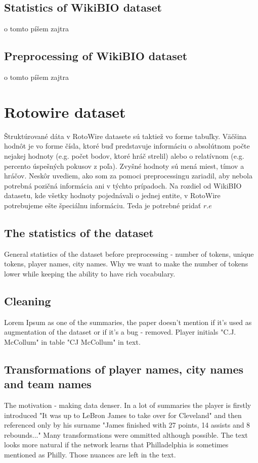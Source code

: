 \subsection{Statistics of WikiBIO dataset}
o tomto píšem zajtra

\subsection {Preprocessing of WikiBIO dataset}
o tomto píšem zajtra


\section{Rotowire dataset}

Štruktúrované dáta v RotoWire datasete sú taktiež vo forme tabuľky. Väčšina hodnôt je vo forme čísla, ktoré buď predstavuje informáciu o absolútnom počte nejakej hodnoty (e.g. počet bodov, ktoré hráč strelil) alebo o relatívnom (e.g. percento úspešných pokusov z poľa). Zvyšné hodnoty sú mená miest, tímov a hráčov. Neskôr uvediem, ako som za pomoci preprocessingu zariadil, aby nebola potrebná pozičná informácia ani v týchto prípadoch. Na rozdiel od WikiBIO datasetu, kde všetky hodnoty pojednávali o jednej entite, v RotoWire potrebujeme ešte špeciálnu informáciu. Teda je potrebné pridať $ r.e $


\subsection{The statistics of the dataset}
General statistics of the dataset before preprocessing - number of tokens, unique tokens, player names, city names. Why we want to make the number of tokens lower while keeping the ability to have rich vocabulary.

\subsection{Cleaning}
Lorem Ipsum as one of the summaries, the paper doesn't mention if it's used as augmentation of the dataset or if it's a bug - removed. Player initials "C.J. McCollum" in table "CJ McCollum" in text. 

\subsection{Transformations of player names, city names and \linebreak[4] team names}
The motivation - making data denser. In a lot of summaries the player is firstly introduced "It was up to LeBron James to take over for Cleveland" and then referenced only by his surname "James finished with 27 points, 14 assists and 8 rebounds..." Many transformations were ommitted although possible. The text looks more natural if the network learns that Philladelphia is sometimes mentioned as Philly. Those nuances are left in the text.

